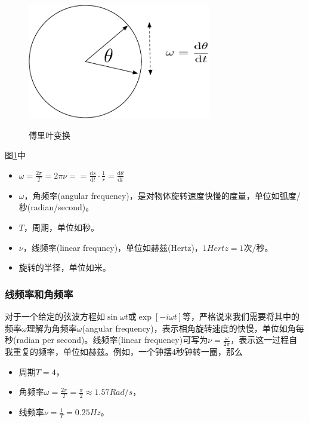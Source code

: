 \begin{figure}[htbp]
   \caption{傅里叶变换}
  \centering
  \includegraphics[width=8cm]{./Figures/20180302-frequencies-etc.pdf}
  \label{fig:fourier-basic-concepts}
%
\end{figure}
图\ref{fig:fourier-basic-concepts}中
\begin{itemize}
  \item $\omega = \frac{2 \pi}{T} = 2 \pi \nu = %
  = \frac{\mathrm{d} s}{\mathrm{d} t} \cdot \frac{1}{r} = \frac{\mathrm{d} \theta}{\mathrm{d} t}$
  \item $\omega$，角频率(angular frequency)，是对物体旋转速度快慢的度量，单位如弧度/秒(radian/second)。
  \item $T$，周期，单位如秒。
  \item $\nu$，线频率(linear frequncy)，单位如赫兹(Hertz)，$1 Hertz = 1\text{次/秒}$。
  \item 旋转的半径，单位如米。
\end{itemize}

\subsubsection{线频率和角频率}
\label{sec:fourier-frequency-linear-angular}
对于一个给定的弦波方程如$\sin \omega t$或$\exp \left[ - i \omega t\right]$等，严格说来我们需要将其中的频率$\omega$理解为角频率$\omega$(angular frequency)，表示相角旋转速度的快慢，单位如角每秒(radian per second)。线频率(linear frequency)可写为$\nu = \frac{\omega}{2 \pi}$，表示这一过程自我重复的频率，单位如赫兹。例如，一个钟摆4秒钟转一圈，那么
\begin{itemize}
  \item 周期$T=4$，
  \item 角频率$\omega = \frac{2 \pi}{T} = \frac{\pi}{2} \approx 1.57 Rad/s$，
  \item 线频率$\nu = \frac{1}{T} = 0.25 Hz$。
\end{itemize}

